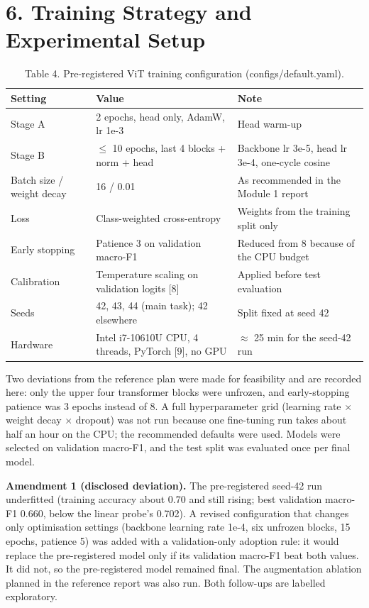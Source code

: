 \documentclass[11pt,a4paper]{article}
\begin{document}
\section*{6. Training Strategy and Experimental Setup}
\begin{table}[H]\centering\small
\caption*{Table 4. Pre-registered ViT training configuration (configs/default.yaml).}
\begin{tabularx}{\linewidth}{XXX}
\toprule
\textbf{Setting} & \textbf{Value} & \textbf{Note} \\
\midrule
Stage A & 2 epochs, head only, AdamW, lr 1e-3 & Head warm-up \\
Stage B & $\leq$ 10 epochs, last 4 blocks + norm + head & Backbone lr 3e-5, head lr 3e-4, one-cycle cosine \\
Batch size / weight decay & 16 / 0.01 & As recommended in the Module 1 report \\
Loss & Class-weighted cross-entropy & Weights from the training split only \\
Early stopping & Patience 3 on validation macro-F1 & Reduced from 8 because of the CPU budget \\
Calibration & Temperature scaling on validation logits [8] & Applied before test evaluation \\
Seeds & 42, 43, 44 (main task); 42 elsewhere & Split fixed at seed 42 \\
Hardware & Intel i7-10610U CPU, 4 threads, PyTorch [9], no GPU & $\approx$ 25 min for the seed-42 run \\
\bottomrule
\end{tabularx}
\end{table}
Two deviations from the reference plan were made for feasibility and are recorded here: only the upper four transformer blocks were unfrozen, and early-stopping patience was 3 epochs instead of 8. A full hyperparameter grid (learning rate $\times$ weight decay $\times$ dropout) was not run because one fine-tuning run takes about half an hour on the CPU; the recommended defaults were used. Models were selected on validation macro-F1, and the test split was evaluated once per final model.

\textbf{Amendment 1 (disclosed deviation).} The pre-registered seed-42 run underfitted (training accuracy about 0.70 and still rising; best validation macro-F1 0.660, below the linear probe's 0.702). A revised configuration that changes only optimisation settings (backbone learning rate 1e-4, six unfrozen blocks, 15 epochs, patience 5) was added with a validation-only adoption rule: it would replace the pre-registered model only if its validation macro-F1 beat both values. It did not, so the pre-registered model remained final. The augmentation ablation planned in the reference report was also run. Both follow-ups are labelled exploratory.
\end{document}
